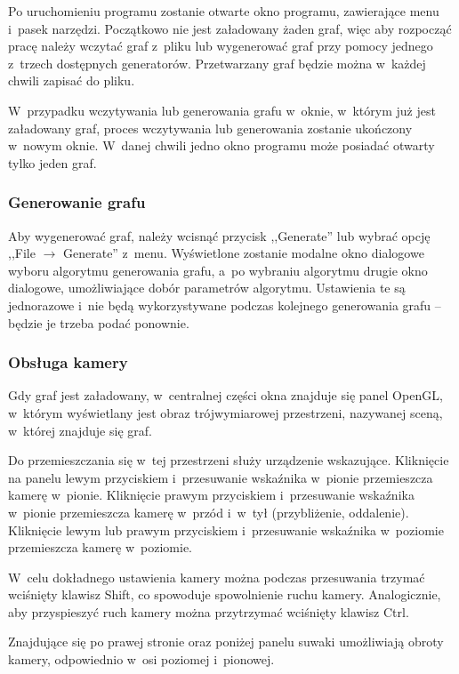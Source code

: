 \documentclass[a4paper,onecolumn,oneside,12pt]{mwart}
\begin{document}
Po uruchomieniu programu zostanie otwarte okno programu, zawierające menu
i~pasek narzędzi. Początkowo nie jest załadowany żaden graf, więc aby
rozpocząć pracę należy wczytać graf z~pliku lub wygenerować graf przy
pomocy jednego z~trzech dostępnych generatorów. Przetwarzany graf będzie
można w~każdej chwili zapisać do pliku.

W~przypadku wczytywania lub generowania grafu w~oknie, w~którym już jest
załadowany graf, proces wczytywania lub generowania zostanie ukończony
w~nowym oknie. W~danej chwili jedno okno programu może posiadać otwarty
tylko jeden graf.

\subsubsection{Generowanie grafu}

Aby wygenerować graf, należy wcisnąć przycisk ,,Generate'' lub wybrać opcję
,,File $\rightarrow$ Generate'' z~menu. Wyświetlone zostanie modalne okno
dialogowe wyboru algorytmu generowania grafu, a~po wybraniu algorytmu
drugie okno dialogowe, umożliwiające dobór parametrów algorytmu. Ustawienia
te są jednorazowe i~nie będą wykorzystywane podczas kolejnego generowania
grafu -- będzie je trzeba podać ponownie.

\subsubsection{Obsługa kamery}

Gdy graf jest załadowany, w~centralnej części okna znajduje się panel
OpenGL, w~którym wyświetlany jest obraz trójwymiarowej przestrzeni,
nazywanej sceną, w~której znajduje się graf.

Do przemieszczania się w~tej przestrzeni służy urządzenie wskazujące.
Kliknięcie na panelu lewym przyciskiem i~przesuwanie wskaźnika w~pionie
przemieszcza kamerę w~pionie. Kliknięcie prawym przyciskiem i~przesuwanie
wskaźnika w~pionie przemieszcza kamerę w~przód i~w~tył
(przybliżenie, oddalenie). Kliknięcie lewym lub prawym przyciskiem
i~przesuwanie wskaźnika w~poziomie przemieszcza kamerę w~poziomie.

W~celu dokładnego ustawienia kamery można podczas przesuwania trzymać
wciśnięty klawisz Shift, co spowoduje spowolnienie ruchu kamery.
Analogicznie, aby przyspieszyć ruch kamery można przytrzymać wciśnięty
klawisz Ctrl.

Znajdujące się po prawej stronie oraz poniżej panelu suwaki umożliwiają
obroty kamery, odpowiednio w~osi poziomej i~pionowej.
\end{document}
